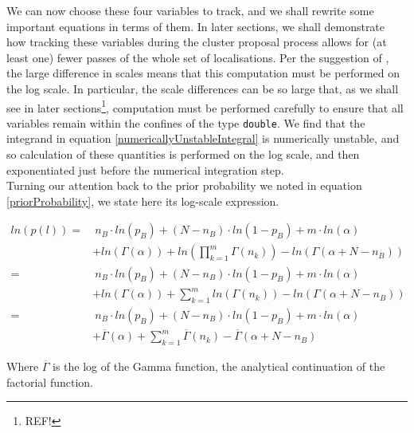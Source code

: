 \documentclass[11pt]{article}
\newcommand{\eq}{=&\ }
\begin{document}
We can now choose these four variables to track, and we shall rewrite some important equations in terms of them. In later sections, we shall demonstrate how tracking these variables during the cluster proposal process allows for (at least one) fewer passes of the whole set of localisations. Per the suggestion of \cite{Rubin-Delanchy2015}, the large difference in scales means that this computation must be performed on the log scale. In particular, the scale differences can be so large that, as we shall see in later sections\footnote{REF!}, computation must be performed carefully to ensure that all variables remain within the confines of the type \texttt{double}. We find that the integrand in equation \ref{numericallyUnstableIntegral} is numerically unstable, and so calculation of these quantities is performed on the log scale, and then exponentiated just before the numerical integration step. \\

Turning our attention back to the prior probability we noted in equation \ref{priorProbability}, we state here its log-scale expression.

\begin{align*}
	ln\left(p\left(l\right)\right) \eq n_{B}\cdot ln\left(p_B\right) + (N-n_B)\cdot ln\left(1-p_B\right) + m\cdot ln\left(\alpha\right) \nonumber \\
	& + ln\left(\Gamma\left(\alpha\right)\right) + ln\left(\prod_{k=1}^{m}\Gamma\left(n_k\right)\right) - ln\left(\Gamma\left(\alpha + N - n_B\right)\right) \\
	\eq n_{B}\cdot ln\left(p_B\right) + (N-n_B)\cdot ln\left(1-p_B\right) + m\cdot ln\left(\alpha\right) \nonumber \\
	& + ln\left(\Gamma\left(\alpha\right)\right) + \sum_{k=1}^{m}ln\left(\Gamma\left(n_k\right)\right) - ln\left(\Gamma\left(\alpha + N - n_B\right)\right) \\
	\eq n_{B}\cdot ln\left(p_B\right) + (N-n_B)\cdot ln\left(1-p_B\right) + m\cdot ln\left(\alpha\right) \nonumber \\
	& + \overline{\Gamma}\left(\alpha\right) + \sum_{k=1}^{m}\overline{\Gamma}\left(n_k\right) - \overline{\Gamma}\left(\alpha + N - n_B\right) 
\end{align*}

Where $\overline{\Gamma}$ is the log of the Gamma function, the analytical continuation of the factorial function.

\end{document}
